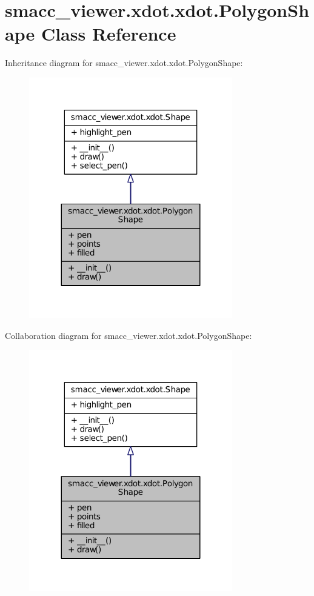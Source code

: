 \hypertarget{classsmacc__viewer_1_1xdot_1_1xdot_1_1PolygonShape}{}\section{smacc\+\_\+viewer.\+xdot.\+xdot.\+Polygon\+Shape Class Reference}
\label{classsmacc__viewer_1_1xdot_1_1xdot_1_1PolygonShape}


Inheritance diagram for smacc\+\_\+viewer.\+xdot.\+xdot.\+Polygon\+Shape\+:
\nopagebreak
\begin{figure}[H]
\begin{center}
\leavevmode
\includegraphics[width=251pt]{classsmacc__viewer_1_1xdot_1_1xdot_1_1PolygonShape__inherit__graph}
\end{center}
\end{figure}


Collaboration diagram for smacc\+\_\+viewer.\+xdot.\+xdot.\+Polygon\+Shape\+:
\nopagebreak
\begin{figure}[H]
\begin{center}
\leavevmode
\includegraphics[width=251pt]{classsmacc__viewer_1_1xdot_1_1xdot_1_1PolygonShape__coll__graph}
\end{center}
\end{figure}
